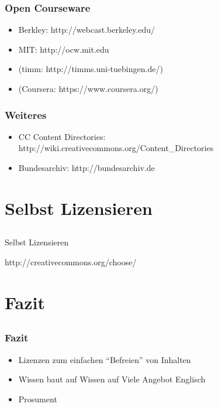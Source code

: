 \documentclass[table]{beamer}
\begin{document}
\begin{frame}
    \frametitle{Open Courseware}
      \begin{itemize}
        \item<2-> Berkley: http://webcast.berkeley.edu/
        \item<3-> MIT: http://ocw.mit.edu
        \item<4-> (timm: http://timms.uni-tuebingen.de/)
        \item<5-> (Coursera: https://www.coursera.org/)
    \end{itemize}
\end{frame}

\begin{frame}
    \frametitle{Weiteres}
      \begin{itemize}
        \item<1-> CC Content Directories: http://wiki.creativecommons.org/Content\_Directories
        \item<2-> Bundesarchiv: http://bundesarchiv.de
      \end{itemize}
\end{frame}

\section{Selbst Lizensieren}
\subsection{}

\begin{frame}
    \begin{center}\Large
    Selbst Lizensieren
    \end {center}
\end{frame}

\begin{frame}
    \begin{center}\Large
    http://creativecommons.org/choose/
    \end {center}
\end{frame}

\section{Fazit}
\subsection{}

\begin{frame}
    \frametitle{Fazit}
    \begin{itemize}
      \item<2-> Lizenzen zum einfachen ``Befreien'' von Inhalten
      \item<3-> Wissen baut auf Wissen auf
       Viele Angebot Englisch
      \item<5-> Prosument
    \end{itemize}
\end{frame}
\end{document}
